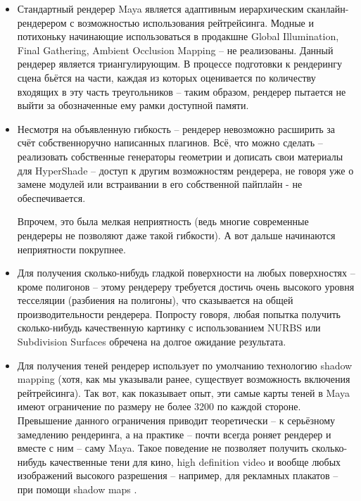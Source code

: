 \begin{itemize}

\item      Стандартный рендерер Maya является
   адаптивным иерархическим сканлайн-рендерером с возможностью
   использования рейтрейсинга. Модные и потихоньку начинающие
   использоваться в продакшне Global Illumination, Final Gathering, Ambient Occlusion Mapping – не
   реализованы. Данный рендерер является триангулирующим. В процессе
   подготовки к рендерингу сцена бьётся на части, каждая из которых
   оценивается по количеству входящих в эту часть треугольников –
   таким образом, рендерер пытается не выйти за обозначенные ему рамки
   доступной памяти.
 

\item     Несмотря на объявленную гибкость –
   рендерер невозможно расширить за счёт собственноручно написанных
   плагинов. Всё, что можно сделать – реализовать собственные
   генераторы геометрии и дописать свои материалы для HyperShade – доступ к другим возможностям рендерера, не говоря уже о
   замене модулей или встраивании в его собственной пайплайн - не
   обеспечивается.
 

Впрочем, это была мелкая неприятность (ведь многие
   современные рендереры не позволяют даже такой гибкости). А вот
   дальше начинаются неприятности покрупнее.
 

\item      Для получения сколько-нибудь гладкой
   поверхности на любых поверхностях – кроме полигонов – этому
   рендереру требуется достичь очень высокого уровня тесселяции
   (разбиения на полигоны), что сказывается на общей
   производительности рендерера. Попросту говоря, любая попытка
   получить сколько-нибудь качественную картинку с
   использованием NURBS или Subdivision Surfaces обречена на долгое ожидание результата.
 

\item      Для получения теней рендерер использует
   по умолчанию технологию shadow mapping (хотя, как
   мы указывали ранее, существует возможность включения рейтрейсинга).
   Так вот, как показывает опыт, эти самые карты теней в Maya имеют ограничение по размеру не более 3200 по каждой стороне.
   Превышение данного ограничения приводит теоретически – к серьёзному
   замедлению рендеринга, а на практике – почти всегда роняет рендерер
   и вместе с ним – саму Maya. Такое
   поведение не позволяет получить сколько-нибудь качественные тени
   для кино, high definition video и вообще любых изображений высокого разрешения – например, для
   рекламных плакатов – при помощи shadow maps .
 


\end{itemize}
